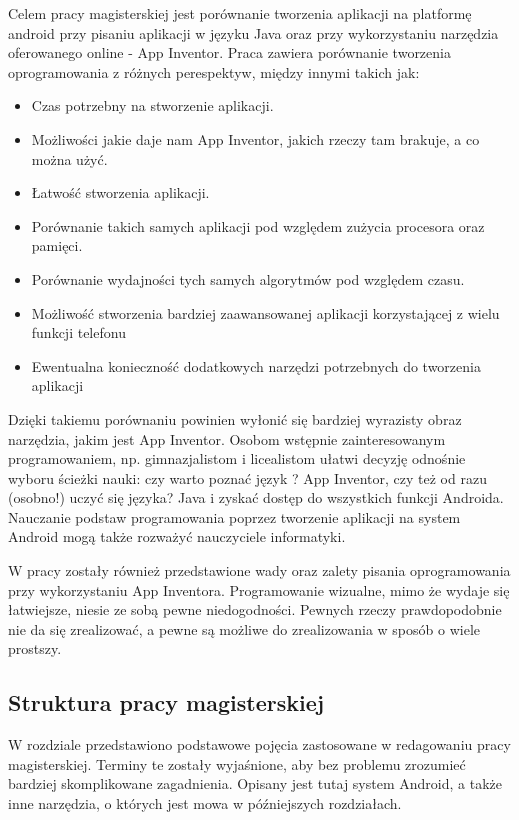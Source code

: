 Celem pracy magisterskiej jest porównanie tworzenia aplikacji na platformę android przy pisaniu aplikacji w języku Java oraz przy wykorzystaniu narzędzia oferowanego online - App Inventor. Praca zawiera porównanie tworzenia oprogramowania z różnych perespektyw, między innymi takich jak:
\begin{itemize}
\item Czas potrzebny na stworzenie aplikacji.
\item Możliwości jakie daje nam App Inventor, jakich rzeczy tam brakuje, a co można użyć.
\item Łatwość stworzenia aplikacji.
\item Porównanie takich samych aplikacji pod względem zużycia procesora oraz pamięci.
\item Porównanie wydajności tych samych algorytmów pod względem czasu.
\item Możliwość stworzenia bardziej zaawansowanej aplikacji korzystającej z wielu funkcji telefonu
\item Ewentualna konieczność dodatkowych narzędzi potrzebnych do tworzenia aplikacji
\end{itemize}

Dzięki takiemu porównaniu powinien wyłonić się bardziej wyrazisty obraz narzędzia, jakim jest App Inventor.  Osobom wstępnie zainteresowanym programowaniem, np.  gimnazjalistom i licealistom ułatwi decyzję odnośnie wyboru ścieżki nauki: czy warto poznać język ? App Inventor, czy też od razu (osobno!) uczyć się języka?  Java i zyskać dostęp do wszystkich funkcji Androida. Nauczanie podstaw programowania poprzez tworzenie aplikacji na system Android mogą także  rozważyć nauczyciele informatyki. 


W pracy zostały również przedstawione wady oraz zalety pisania oprogramowania przy wykorzystaniu App Inventora. Programowanie wizualne, mimo że wydaje się łatwiejsze, niesie ze sobą pewne niedogodności. Pewnych rzeczy prawdopodobnie nie da się zrealizować, a pewne są możliwe do zrealizowania w sposób o wiele prostszy. 


\subsection{Struktura pracy magisterskiej}

W rozdziale  przedstawiono podstawowe pojęcia zastosowane w redagowaniu pracy magisterskiej. Terminy te zostały wyjaśnione, aby bez problemu zrozumieć bardziej skomplikowane zagadnienia. Opisany jest tutaj system Android, a także inne narzędzia, o których jest mowa w późniejszych rozdziałach.


